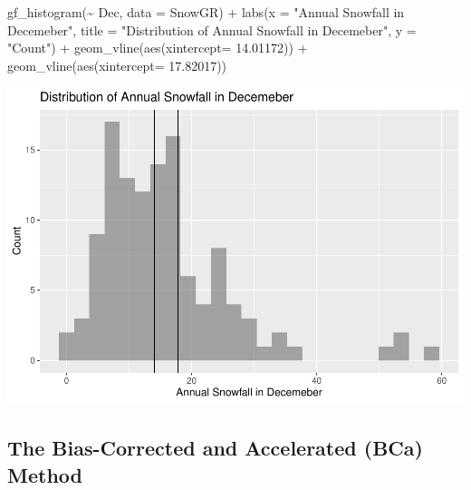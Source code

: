 \documentclass[12pt]{article}
\newenvironment{Shaded}{\begin{snugshade}}{\end{snugshade}}
\newcommand{\AttributeTok}[1]{\textcolor[rgb]{0.77,0.63,0.00}{#1}}
\newcommand{\FloatTok}[1]{\textcolor[rgb]{0.00,0.00,0.81}{#1}}
\newcommand{\FunctionTok}[1]{\textcolor[rgb]{0.00,0.00,0.00}{#1}}
\newcommand{\NormalTok}[1]{#1}
\newcommand{\SpecialCharTok}[1]{\textcolor[rgb]{0.00,0.00,0.00}{#1}}
\newcommand{\StringTok}[1]{\textcolor[rgb]{0.31,0.60,0.02}{#1}}
\begin{document}
\begin{Shaded}
\begin{Highlighting}[]
\FunctionTok{gf\_histogram}\NormalTok{(}\SpecialCharTok{\textasciitilde{}}\NormalTok{ Dec, }\AttributeTok{data =}\NormalTok{ SnowGR) }\SpecialCharTok{+}
  \FunctionTok{labs}\NormalTok{(}\AttributeTok{x =} \StringTok{"Annual Snowfall in Decemeber"}\NormalTok{, }
       \AttributeTok{title =} \StringTok{"Distribution of Annual Snowfall in Decemeber"}\NormalTok{, }\AttributeTok{y =} \StringTok{"Count"}\NormalTok{) }\SpecialCharTok{+}
  \FunctionTok{geom\_vline}\NormalTok{(}\FunctionTok{aes}\NormalTok{(}\AttributeTok{xintercept=} \FloatTok{14.01172}\NormalTok{)) }\SpecialCharTok{+}
  \FunctionTok{geom\_vline}\NormalTok{(}\FunctionTok{aes}\NormalTok{(}\AttributeTok{xintercept=} \FloatTok{17.82017}\NormalTok{))}
\end{Highlighting}
\end{Shaded}

\includegraphics{paper_files/figure-latex/unnamed-chunk-12-1.pdf}

\hypertarget{the-bias-corrected-and-accelerated-bca-method}{%
\subsection{The Bias-Corrected and Accelerated (BCa)
Method}\label{the-bias-corrected-and-accelerated-bca-method}}
\end{document}
